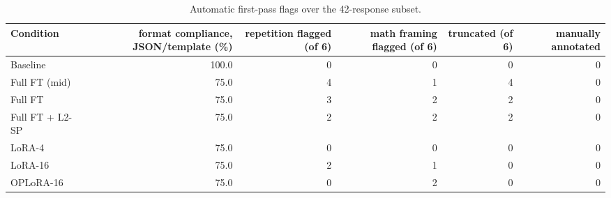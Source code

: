 \begin{table}[t]
\centering\small
\begin{tabular}{lrrrrr}
\toprule
Condition & format compliance, JSON/template (\%) & repetition flagged (of 6) & math framing flagged (of 6) & truncated (of 6) & manually annotated \\
\midrule
Baseline & 100.0 & 0 & 0 & 0 & 0 \\
Full FT (mid) & 75.0 & 4 & 1 & 4 & 0 \\
Full FT & 75.0 & 3 & 2 & 2 & 0 \\
Full FT + L2-SP & 75.0 & 2 & 2 & 2 & 0 \\
LoRA-4 & 75.0 & 0 & 0 & 0 & 0 \\
LoRA-16 & 75.0 & 2 & 1 & 0 & 0 \\
OPLoRA-16 & 75.0 & 0 & 2 & 0 & 0 \\
\bottomrule
\end{tabular}
\caption{Automatic first-pass flags over the 42-response subset.}
\label{tab:task1_qualitative_summary}
\end{table}
